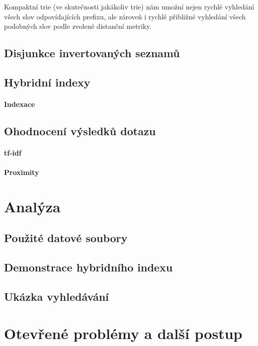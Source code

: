\documentclass[11pt]{article}
\begin{document}
Kompaktní trie (ve skutečnosti jakákoliv trie) nám umožní nejen rychlé
vyhledání všech slov odpovídajících prefixu, ale zároveň i rychlé přibližné
vyhledání všech podobných slov podle zvolené distanční metriky.


\subsection{Disjunkce invertovaných seznamů}
\subsection{Hybridní indexy}
\paragraph{Indexace}

\subsection{Ohodnocení výsledků dotazu}
\paragraph{tf-idf}
\paragraph{Proximity}


\section{Analýza}
\subsection{Použité datové soubory}
\subsection{Demonstrace hybridního indexu}
\subsection{Ukázka vyhledávání}

\section{Otevřené problémy a další postup}
\end{document}
